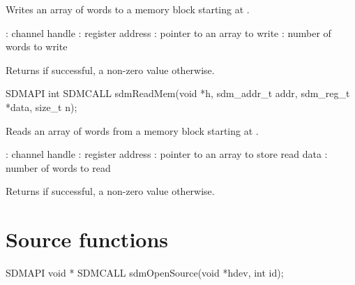 \documentclass[a4paper,12pt,twoside,extrafontsizes]{memoir}
\begin{document}
\begin{funcdescr}
	Writes an array of words to a memory block starting at .
\end{funcdescr}

\begin{funcparams}
	: channel handle
	: register address
	: pointer to an array to write
	: number of words to write
\end{funcparams}

\begin{funcret}
	Returns  if successful, a non-zero value otherwise.
\end{funcret}



\begin{cfuncprototype}
SDMAPI int SDMCALL sdmReadMem(void *h, sdm_addr_t addr, sdm_reg_t *data, size_t n);
\end{cfuncprototype}

\begin{funcdescr}
	Reads an array of words from a memory block starting at .
\end{funcdescr}

\begin{funcparams}
	: channel handle
	: register address
	: pointer to an array to store read data
	: number of words to read
\end{funcparams}

\begin{funcret}
	Returns  if successful, a non-zero value otherwise.
\end{funcret}

\section{Source functions}
\label{sec:sourcefunctions}



\begin{cfuncprototype}
SDMAPI void * SDMCALL sdmOpenSource(void *hdev, int id);
\end{cfuncprototype}
\end{document}
